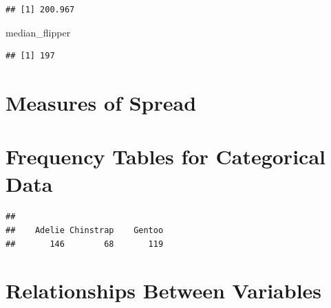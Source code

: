 \documentclass[
]{book}
\newenvironment{Shaded}{\begin{snugshade}}{\end{snugshade}}
\newcommand{\FunctionTok}[1]{\textcolor[rgb]{0.13,0.29,0.53}{\textbf{#1}}}
\newcommand{\NormalTok}[1]{#1}
\newcommand{\OtherTok}[1]{\textcolor[rgb]{0.56,0.35,0.01}{#1}}
\newcommand{\SpecialCharTok}[1]{\textcolor[rgb]{0.81,0.36,0.00}{\textbf{#1}}}
\begin{document}
\begin{verbatim}
## [1] 200.967
\end{verbatim}

\begin{Shaded}
\begin{Highlighting}[]
\NormalTok{median\_flipper}
\end{Highlighting}
\end{Shaded}

\begin{verbatim}
## [1] 197
\end{verbatim}

\hypertarget{measures-of-spread}{%
\section{Measures of Spread}\label{measures-of-spread}}

\begin{Shaded}
\end{Shaded}

\hypertarget{frequency-tables-for-categorical-data}{%
\section{Frequency Tables for Categorical Data}\label{frequency-tables-for-categorical-data}}

\begin{Shaded}
\end{Shaded}

\begin{verbatim}
## 
##    Adelie Chinstrap    Gentoo 
##       146        68       119
\end{verbatim}

\hypertarget{relationships-between-variables}{%
\section{Relationships Between Variables}\label{relationships-between-variables}}
\end{document}
